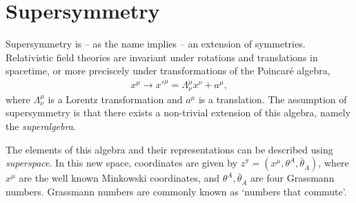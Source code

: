 \documentclass[twoside,english]{uiofysmaster}
\begin{document}
\section{Supersymmetry}

Supersymmetry is -- as the name implies -- an extension of symmetries. Relativistic field theories are invariant under rotations and translations in spacetime, or more preciscely under transformations of the Poincar\'{e} algebra,
\begin{align}
x^{\mu} \rightarrow x'^{\mu} = \Lambda_{\nu}^{\mu} x^{\nu} + a^{\mu}, 
\end{align}
where $\Lambda_{\nu}^{\mu}$ is a Lorentz transformation and $a^{\mu}$ is a translation. The assumption of supersymmetry is that there exists a non-trivial extension of this algebra, namely the \textit{superalgebra}. 

The elements of this algebra and their representations can be described using \textit{superspace}. In this new space, coordinates are given by $z^{\pi} = (x^{\mu}, \theta^A, \bar{\theta}_{\dot{A}})$, where $x^{\mu}$ are the well known Minkowski coordinates, and $\theta^A, \bar{\theta}_{\dot{A}}$ are four Grassmann numbers. Grassmann numbers are commonly known as `numbers that commute'. 
\end{document}

